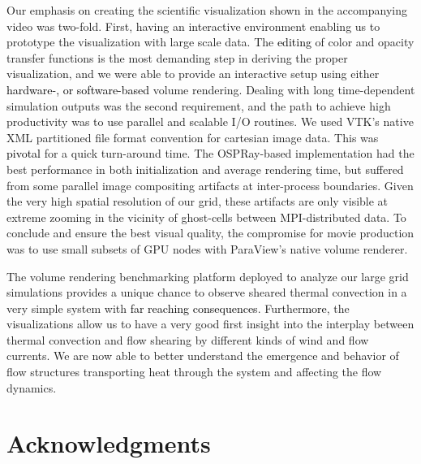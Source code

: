 \documentclass[5p,times]{elsarticle}
\begin{document}
Our emphasis \textcolor{black}{o}n creating the scientific visualization shown in the accompanying video \cite{fav18} was two-fold. 
First, having an interactive environment enabling us to prototype the visualization with large scale data. The \textcolor{black}{editing} of color and opacity transfer functions is the most demanding step in
deriving the proper visualization, and we were able to provide an interactive setup using either \textcolor{black}{hardware-, or software-based} volume rendering. Dealing with long time-dependent simulation outputs was the second requirement, and the path to achieve high productivity was to use parallel and scalable I/O routines. We used VTK's native XML partitioned file format convention for cartesian image data. This was \textcolor{black}{pivotal} for a quick turn-around time. The OSPRay-based implementation had the best performance in both initialization and average rendering time, but suffered from some parallel image compositing artifacts at inter-process boundaries. Given the very high spatial resolution of our grid, these artifacts are only visible at extreme zooming in the vicinity of ghost-cells between MPI-distributed data. To conclude and ensure the best visual quality, the compromise for movie production was to use small subsets of GPU nodes with ParaView's native volume renderer.

The volume rendering benchmarking platform deployed to analy\textcolor{black}{z}e our large grid simulations provides a unique chance to observe sheared thermal convection in a very simple system with \textcolor{black}{far reaching consequences}. Further\textcolor{black}{more}, the visualizations allow us to have a very good first insight into the interplay between thermal convection and flow shearing by different kinds of wind and flow currents. We are now able to better understand the emergence and behavior of flow structures transporting heat through the system and affecting the flow dynamics.




\section*{Acknowledgments}
\end{document}
